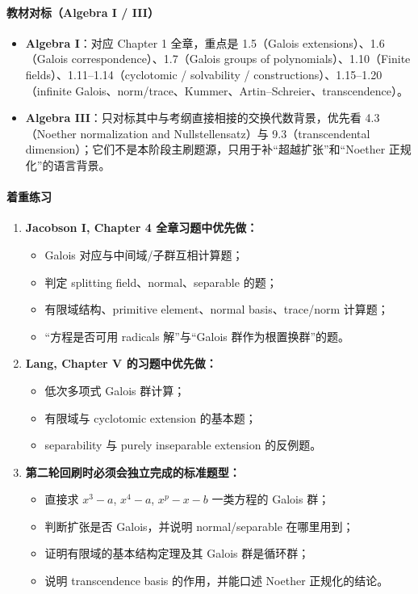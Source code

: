 \documentclass[12pt,a4paper]{ctexart}
\begin{document}
\paragraph{教材对标（Algebra I / III）}
\begin{itemize}
  \item \textbf{Algebra I}：对应 Chapter 1 全章，重点是 1.5（Galois extensions）、1.6（Galois correspondence）、1.7（Galois groups of polynomials）、1.10（Finite fields）、1.11--1.14（cyclotomic / solvability / constructions）、1.15--1.20（infinite Galois、norm/trace、Kummer、Artin--Schreier、transcendence）。
  \item \textbf{Algebra III}：只对标其中与考纲直接相接的交换代数背景，优先看 4.3（Noether normalization and Nullstellensatz）与 9.3（transcendental dimension）；它们不是本阶段主刷题源，只用于补“超越扩张”和“Noether 正规化”的语言背景。
\end{itemize}

\paragraph{着重练习}
\begin{enumerate}
  \item \textbf{Jacobson I, Chapter 4 全章习题中优先做：}
  \begin{itemize}
    \item Galois 对应与中间域/子群互相计算题；
    \item 判定 splitting field、normal、separable 的题；
    \item 有限域结构、primitive element、normal basis、trace/norm 计算题；
    \item “方程是否可用 radicals 解”与“Galois 群作为根置换群”的题。
  \end{itemize}
  \item \textbf{Lang, Chapter V 的习题中优先做：}
  \begin{itemize}
    \item 低次多项式 Galois 群计算；
    \item 有限域与 cyclotomic extension 的基本题；
    \item separability 与 purely inseparable extension 的反例题。
  \end{itemize}
  \item \textbf{第二轮回刷时必须会独立完成的标准题型：}
  \begin{itemize}
    \item 直接求 \(x^3-a\), \(x^4-a\), \(x^p-x-b\) 一类方程的 Galois 群；
    \item 判断扩张是否 Galois，并说明 normal/separable 在哪里用到；
    \item 证明有限域的基本结构定理及其 Galois 群是循环群；
    \item 说明 transcendence basis 的作用，并能口述 Noether 正规化的结论。
  \end{itemize}
\end{enumerate}
\end{document}
